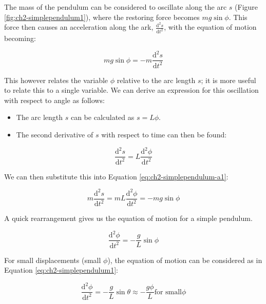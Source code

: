 \documentclass[
]{book}
\providecommand{\tightlist}{%
  \setlength{\itemsep}{0pt}\setlength{\parskip}{0pt}}
\begin{document}
The mass of the pendulum can be considered to oscillate along the arc \(s\) (Figure \ref{fig:ch2-simplependulum1}), where the restoring force becomes \(mg \sin \phi\). This force then causes an acceleration along the ark, \(\frac{\mathrm{d}^2 s}{\mathrm{d} t^2}\), with the equation of motion becoming:

\begin{equation}
mg \sin \phi = - m \frac{\mathrm{d}^2 s}{\mathrm{d} t^2}
\label{eq:ch2-simplependulum-a1}
\end{equation}

This however relates the variable \(\phi\) relative to the arc length \(s\); it is more useful to relate this to a single variable. We can derive an expression for this oscillation with respect to angle as follows:

\begin{itemize}
\tightlist
\item
  The arc length \(s\) can be calculated as \(s = L \phi\).
\item
  The second derivative of \(s\) with respect to time can then be found:
\end{itemize}

\begin{equation}
\frac{\mathrm{d}^2 s}{\mathrm{d} t^2} = L \frac{\mathrm{d}^2 \phi}{\mathrm{d} t^2}
\label{eq:ch2-simplependulum-a2}
\end{equation}

We can then substitute this into Equation \eqref{eq:ch2-simplependulum-a1}:

\begin{equation}
m \frac{\mathrm{d}^2 s}{\mathrm{d} t^2} = m L \frac{\mathrm{d}^2 \phi}{\mathrm{d} t^2} =  -mg \sin \phi
\label{eq:ch2-simplependulum-a3}
\end{equation}

A quick rearrangement gives us the equation of motion for a simple pendulum.

\begin{equation}
\frac{\mathrm{d}^2 \phi}{\mathrm{d} t^2} =  -\frac{g}{L} \sin \phi
\label{eq:ch2-simplependulum-a3}
\end{equation}

For small displacements (small \(\phi\)), the equation of motion can be considered as in Equation \eqref{eq:ch2-simplependulum1}:

\begin{equation}
\frac{\mathrm{d}^2 \phi}{\mathrm{d} t^2} = -\frac{g}{L}\sin \theta \approx -\frac{g \phi}{L} \textrm{for small} \phi
\label{eq:ch2-simplependulum1}
\end{equation}
\end{document}
